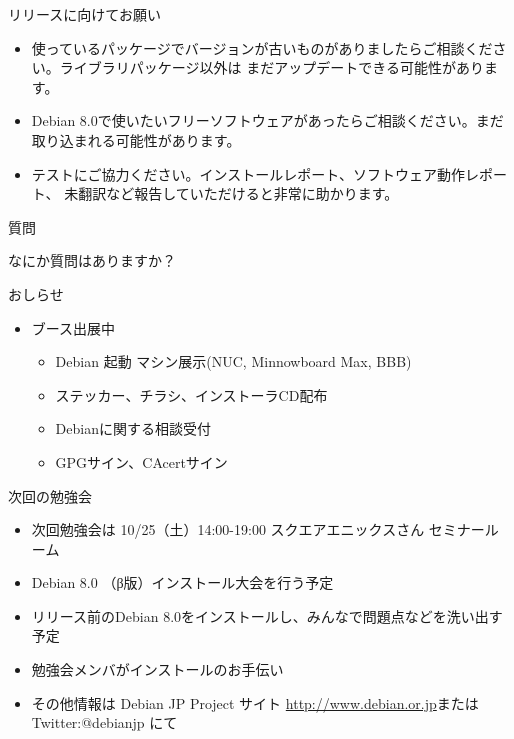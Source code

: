 \begin{frame}{リリースに向けてお願い}
\begin{itemize}
\item 使っているパッケージでバージョンが古いものがありましたらご相談ください。ライブラリパッケージ以外は
まだアップデートできる可能性があります。
\item Debian 8.0で使いたいフリーソフトウェアがあったらご相談ください。まだ取り込まれる可能性があります。
\item テストにご協力ください。インストールレポート、ソフトウェア動作レポート、
未翻訳など報告していただけると非常に助かります。
\end{itemize}

\end{frame}

\begin{frame}[containsverbatim]{質問}

\begin{center}
なにか質問はありますか？
\end{center}

\end{frame}

\begin{frame}{おしらせ}
\begin{itemize}
\item ブース出展中
\begin{itemize}
\item Debian 起動 マシン展示(NUC, Minnowboard Max, BBB)
\item ステッカー、チラシ、インストーラCD配布
\item Debianに関する相談受付
\item GPGサイン、CAcertサイン
\end{itemize}
\end{itemize}

\end{frame}

\begin{frame}{次回の勉強会}
\begin{itemize}
\item 次回勉強会は 10/25（土）14:00-19:00 スクエアエニックスさん セミナールーム
\item Debian 8.0 （β版）インストール大会を行う予定
\item リリース前のDebian 8.0をインストールし、みんなで問題点などを洗い出す予定
\item 勉強会メンバがインストールのお手伝い
\item その他情報は Debian JP Project サイト \url{http://www.debian.or.jp}または Twitter:@debianjp にて
\end{itemize}
\end{frame}


